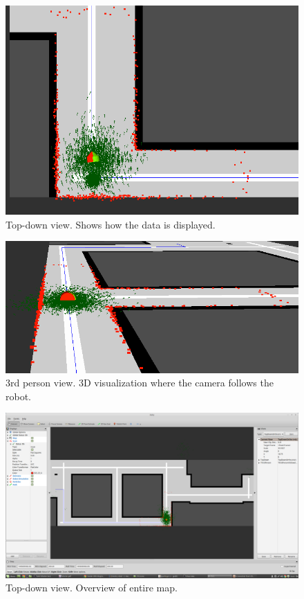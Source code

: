 \begin{figure}[H]
\centering
\includegraphics[scale=0.50]{images/rviz_close}
\caption{Top-down view. Shows how the data is displayed.}
\label{fig:rviz_close}
\end{figure}

\begin{figure}[H]
\centering
\includegraphics[scale=0.50]{images/rviz_follow}
\caption{3rd person view. 3D visualization where the camera follows the robot.}
\label{fig:rviz_follow}
\end{figure}

\begin{figure}[H]
\centering
\includegraphics[scale=0.20]{images/rviz_top}
\caption{Top-down view. Overview of entire map.}
\label{fig:rviz_top}
\end{figure}
